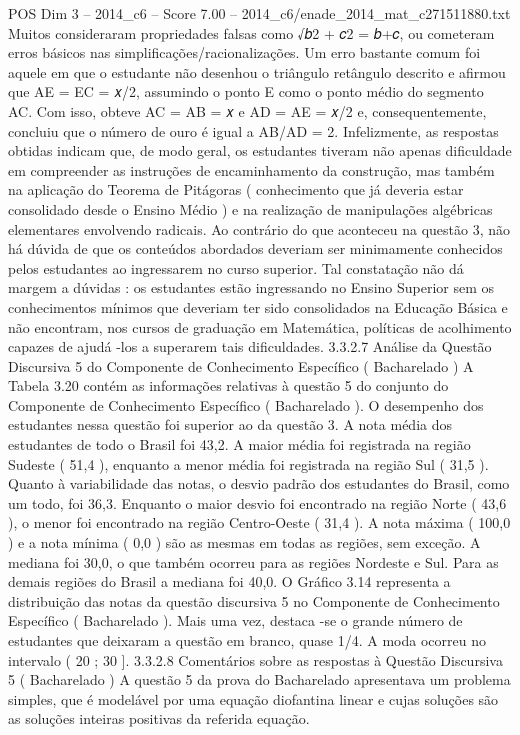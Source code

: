 \begin{textsample}{POS Dim 3 – 2014\_c6 – Score 7.00 – 2014\_c6/enade\_2014\_mat\_c271511880.txt}
Muitos consideraram propriedades falsas como √𝑏2 + 𝑐2 = 𝑏+𝑐, ou cometeram erros básicos nas simplificações/racionalizações.
Um erro bastante comum foi aquele em que o estudante não desenhou o triângulo retângulo descrito e afirmou que AE = EC = 𝑥/2, assumindo o ponto E como o ponto médio do segmento AC.
Com isso, obteve AC = AB = 𝑥 e AD = AE = 𝑥/2 e, consequentemente, concluiu que o número de ouro é igual a AB/AD = 2.
Infelizmente, as respostas obtidas indicam que, de modo geral, os estudantes tiveram não apenas dificuldade em compreender as instruções de encaminhamento da construção, mas também na aplicação do Teorema de Pitágoras ( conhecimento que já deveria estar consolidado desde o Ensino Médio ) e na realização de manipulações algébricas elementares envolvendo radicais.
Ao contrário do que aconteceu na questão 3, não há dúvida de que os conteúdos abordados deveriam ser minimamente conhecidos pelos estudantes ao ingressarem no curso superior.
Tal constatação não dá margem a dúvidas : os estudantes estão ingressando no Ensino Superior sem os conhecimentos mínimos que deveriam ter sido consolidados na Educação Básica e não encontram, nos cursos de graduação em Matemática, políticas de acolhimento capazes de ajudá -los a superarem tais dificuldades. 3.3.2.7 Análise da Questão Discursiva 5 do Componente de Conhecimento Específico ( Bacharelado ) A Tabela 3.20 contém as informações relativas à questão 5 do conjunto do Componente de Conhecimento Específico ( Bacharelado ).
O desempenho dos estudantes nessa questão foi superior ao da questão 3.
A nota média dos estudantes de todo o Brasil foi 43,2.
A maior média foi registrada na região Sudeste ( 51,4 ), enquanto a menor média foi registrada na região Sul ( 31,5 ).
Quanto à variabilidade das notas, o desvio padrão dos estudantes do Brasil, como um todo, foi 36,3.
Enquanto o maior desvio foi encontrado na região Norte ( 43,6 ), o menor foi encontrado na região Centro-Oeste ( 31,4 ).
A nota máxima ( 100,0 ) e a nota mínima ( 0,0 ) são as mesmas em todas as regiões, sem exceção.
A mediana foi 30,0, o que também ocorreu para as regiões Nordeste e Sul.
Para as demais regiões do Brasil a mediana foi 40,0.
O Gráfico 3.14 representa a distribuição das notas da questão discursiva 5 no Componente de Conhecimento Específico ( Bacharelado ).
Mais uma vez, destaca -se o grande número de estudantes que deixaram a questão em branco, quase 1/4.
A moda ocorreu no intervalo ( 20 ; 30 ]. 3.3.2.8 Comentários sobre as respostas à Questão Discursiva 5 ( Bacharelado ) A questão 5 da prova do Bacharelado apresentava um problema simples, que é modelável por uma equação diofantina linear e cujas soluções são as soluções inteiras positivas da referida equação.

\end{textsample}

